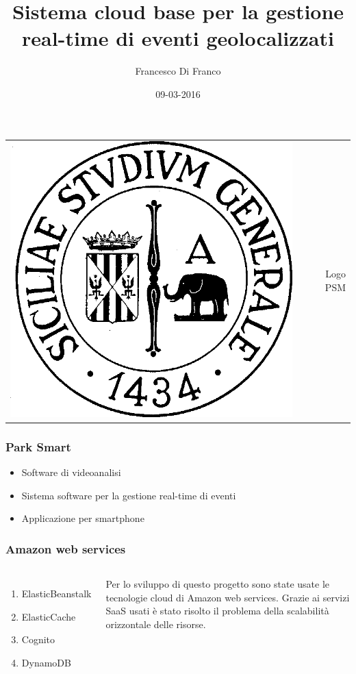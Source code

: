 \documentclass{beamer}
\title[Relazione progetto finale]{Sistema cloud base per la gestione real-time di eventi geolocalizzati}
\author{Francesco Di Franco} %
\institute[UniCT] 
{
Univerist\`a degli studi di Catania \\ %
\medskip
\textit{} 
}
\date{09-03-2016}
\begin{document}
\begin{frame}
\begin{table}[]
\centering
\begin{tabular}{lcr}

\includegraphics[scale=0.15]{../img/logo_unict.png}
&  &  Logo PSM\\ 
\end{tabular}
\end{table}
\titlepage
\end{frame}


\begin{frame}
\frametitle{Park Smart}
\begin{itemize}
\item Software di videoanalisi
\item Sistema software per la gestione real-time di eventi
\item Applicazione per smartphone
\end{itemize}
\end{frame}


\begin{frame}
\frametitle{Amazon web services}
\begin{columns}[c] 


\begin{enumerate}
\item ElasticBeanstalk
\item ElasticCache
\item Cognito
\item DynamoDB
\end{enumerate}

Per lo sviluppo di questo progetto sono state usate le tecnologie cloud di Amazon web services. Grazie ai servizi SaaS usati \`e stato risolto il problema della scalabilit\`a orizzontale delle risorse.

\end{columns}
\end{frame}
\end{document}
